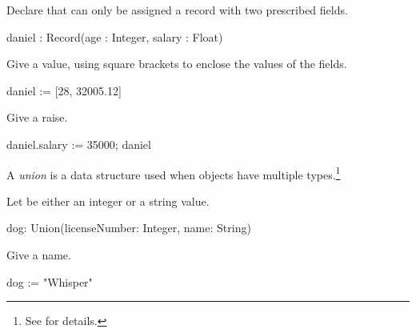 {{{{{{{{\begin{xtc}
\begin{xtccomment}
Declare that  can only be
assigned a record with two prescribed fields.
\end{xtccomment}
\begin{spadsrc}
daniel : Record(age : Integer, salary : Float) 
\end{spadsrc}
\end{xtc}
\begin{xtc}
\begin{xtccomment}
Give  a value, using square brackets to enclose the values of
the fields.
\end{xtccomment}
\begin{spadsrc}
daniel := [28, 32005.12] 
\end{spadsrc}
\begin{TeXOutput}
\begin{fricasmath}{23}
%
\end{fricasmath}
\end{TeXOutput}
\end{xtc}
\begin{xtc}
\begin{xtccomment}
Give  a raise.
\end{xtccomment}
\begin{spadsrc}
daniel.salary := 35000; daniel 
\end{spadsrc}
\begin{TeXOutput}
\begin{fricasmath}{24}
%
\end{fricasmath}
\end{TeXOutput}
\end{xtc}

A {\it union}
is a data structure used when objects
have multiple types.\footnote{See  for details.}

\begin{xtc}
\begin{xtccomment}
Let  be either an integer or a string value.
\end{xtccomment}
\begin{spadsrc}
dog: Union(licenseNumber: Integer, name: String)
\end{spadsrc}
\end{xtc}
\begin{xtc}
\begin{xtccomment}
Give  a name.
\end{xtccomment}
\begin{spadsrc}
dog := "Whisper"
\end{spadsrc}
\begin{TeXOutput}
\begin{fricasmath}{26}
%
\end{fricasmath}
\end{TeXOutput}
\end{xtc}

}}}}}}}}

